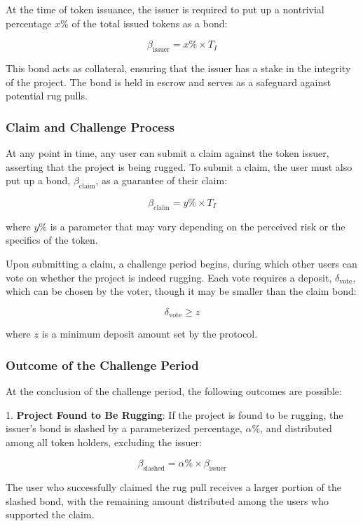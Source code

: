 \documentclass{article}
\begin{document}
At the time of token issuance, the issuer is required to put up a nontrivial percentage \(x\%\) of the total issued tokens as a bond:

\[
\beta_{\text{issuer}} = x\% \times T_I
\]

This bond acts as collateral, ensuring that the issuer has a stake in the integrity of the project. The bond is held in escrow and serves as a safeguard against potential rug pulls.

\subsubsection{Claim and Challenge Process}

At any point in time, any user can submit a claim against the token issuer, asserting that the project is being rugged. To submit a claim, the user must also put up a bond, \(\beta_{\text{claim}}\), as a guarantee of their claim:

\[
\beta_{\text{claim}} = y\% \times T_I
\]

where \(y\%\) is a parameter that may vary depending on the perceived risk or the specifics of the token.

Upon submitting a claim, a challenge period begins, during which other users can vote on whether the project is indeed rugging. Each vote requires a deposit, \(\delta_{\text{vote}}\), which can be chosen by the voter, though it may be smaller than the claim bond:

\[
\delta_{\text{vote}} \geq z
\]

where \(z\) is a minimum deposit amount set by the protocol.

\subsubsection{Outcome of the Challenge Period}

At the conclusion of the challenge period, the following outcomes are possible:

1. \textbf{Project Found to Be Rugging}: If the project is found to be rugging, the issuer's bond is slashed by a parameterized percentage, \(\alpha\%\), and distributed among all token holders, excluding the issuer:

\[
\beta_{\text{slashed}} = \alpha\% \times \beta_{\text{issuer}}
\]

The user who successfully claimed the rug pull receives a larger portion of the slashed bond, with the remaining amount distributed among the users who supported the claim.
\end{document}
